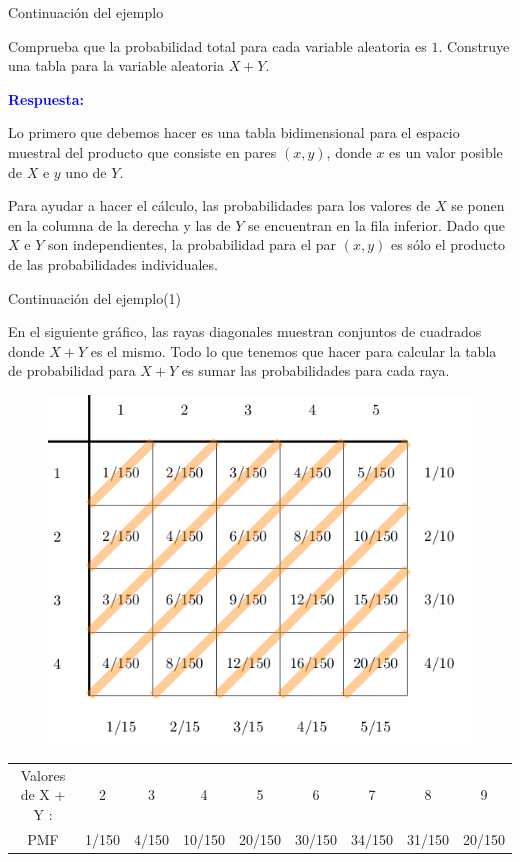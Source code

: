 \documentclass[10pt]{beamer}
\begin{document}
\begin{frame}{Continuaci\'on del ejemplo}
	
\small{Comprueba que la probabilidad total para cada variable aleatoria es $1$. Construye  una tabla para la variable aleatoria $X + Y$.
	
\vspace{0.5cm}


\textbf{\textcolor{blue}{Respuesta:}}

Lo primero que debemos hacer es una tabla bidimensional para el espacio  muestral del producto que consiste en pares $(x, y)$, donde $x$ es un valor posible de $X$ e $y$ uno de $Y$.

Para ayudar a hacer el c\'alculo, las probabilidades para los valores de $X$ se ponen en la columna de la derecha y las de $Y$ se encuentran en la fila inferior. Dado que $X$ e $Y$ son independientes, la probabilidad para el par $(x, y)$ es s\'olo el producto de las probabilidades individuales.	
}
\end{frame}

\begin{frame}{Continuaci\'on del ejemplo(1)}
\small{

En el siguiente gr\'afico, las rayas diagonales muestran conjuntos de cuadrados donde $X + Y$ es el mismo. Todo lo que tenemos que hacer para calcular la tabla de probabilidad para $X + Y$ es sumar las probabilidades para cada raya.}

	
\begin{figure}[ht]
	\centering
	\includegraphics[scale=.3]{v18.png}
\end{figure}

 \scriptsize{
\begin{table}[]
	\centering
	\begin{tabular}{ccccccccc}
		Valores de X + Y : & 2     & 3     & 4      & 5      & 6      & 7      & 8      & 9      \\
		PMF                & 1/150 & 4/150 & 10/150 & 20/150 & 30/150 & 34/150 & 31/150 & 20/150
	\end{tabular}
\end{table}
}
\end{frame}
\end{document}
